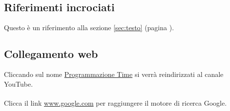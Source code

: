 \documentclass[a4paper,12pt,oneside]{book}
\theoremstyle{plain}
\begin{document}
	
	\subsection{Riferimenti incrociati}
	Questo è un riferimento alla sezione \ref{sec:testo} (pagina \pageref{sec:testo}).
	
	
	\subsection{Collegamento web}
	Cliccando sul nome \href{https://www.youtube.com/channel/UCDq9FlqxaAZmgoLBgf5KtYA}{Programmazione Time} si verrà reindirizzati al canale YouTube.\\
	\\
	Clicca il link \url{www.google.com} per raggiungere il motore di ricerca Google.
	
	
	
\end{document}
